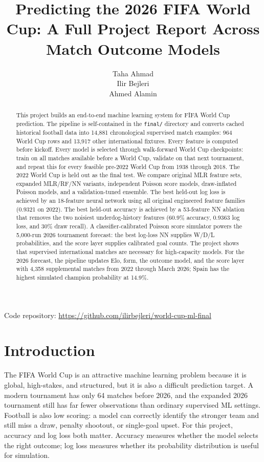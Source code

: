 \documentclass{article}
\title{Predicting the 2026 FIFA World Cup: A Full Project Report Across Match Outcome Models}
\author{%
  Taha Ahmad \\
  \And
  Ilir Bejleri \\
  \And
  Ahmed Alamin \\
}
\begin{document}
\maketitle
\begin{center}
  \small Code repository:
  \url{https://github.com/ilirbejleri/world-cup-ml-final}
\end{center}

\begin{abstract}
This project builds an end-to-end machine learning system for FIFA World Cup
prediction. The pipeline is self-contained in the
\texttt{final/} directory \citep{worldcupmlrepo} and converts cached historical football data into
14,881 chronological supervised match examples: 964 World Cup rows and 13,917
other international fixtures. Every feature is computed before kickoff. Every
model is selected through walk-forward World Cup checkpoints: train on all
matches available before a World Cup, validate on that next tournament, and
repeat this for every feasible pre-2022 World Cup from 1938 through 2018. The
2022 World Cup is held out as the final test. We compare original MLR feature
sets, expanded MLR/RF/NN variants, independent Poisson score models,
draw-inflated Poisson models, and a validation-tuned ensemble. The best
held-out log loss is achieved by an 18-feature neural network using all
original engineered feature families (0.9321 on 2022). The best held-out
accuracy is achieved by a 53-feature NN ablation that removes the two noisiest
underdog-history features (60.9\% accuracy, 0.9363 log loss, and 30\% draw
recall). A classifier-calibrated Poisson score simulator powers the 5,000-run
2026 tournament forecast: the best log-loss NN supplies W/D/L probabilities,
and the score layer supplies calibrated goal counts. The project shows that
supervised international matches are necessary for high-capacity models. For
the 2026 forecast, the pipeline updates Elo, form, the outcome model, and the
score layer with 4,358 supplemental matches from 2022 through March 2026; Spain
has the highest simulated champion probability at 14.9\%.
\end{abstract}

\section{Introduction}

The FIFA World Cup is an attractive machine learning problem because it is
global, high-stakes, and structured, but it is also a difficult prediction
target. A modern tournament has only 64 matches before 2026, and the expanded
2026 tournament still has far fewer observations than ordinary supervised ML
settings. Football is also low scoring: a model can correctly identify the
stronger team and still miss a draw, penalty shootout, or single-goal upset.
For this project, accuracy and log loss both matter. Accuracy measures whether
the model selects the right outcome; log loss measures whether its probability
distribution is useful for simulation.
\end{document}
